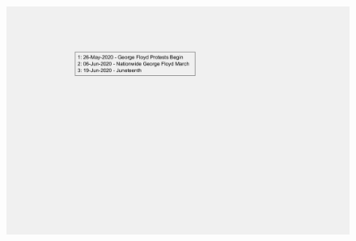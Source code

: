 \documentclass[]{article}
\begin{document}
\begin{figure}[!h]
	\includegraphics[width=\linewidth]{legends/BLM_legend.png}
	\caption{}
	\label{fig:legends/BLM_legendLabel}
\end{figure}
\end{document}

